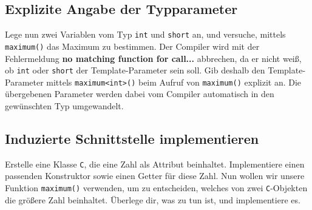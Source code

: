 \subsection{Explizite Angabe der Typparameter}
Lege nun zwei Variablen vom Typ \lstinline{int} und \lstinline{short} an, und versuche, mittels \lstinline{maximum()} das Maximum zu bestimmen.
Der Compiler wird mit der Fehlermeldung \textbf{no matching function for call...} abbrechen, da er nicht weiß, ob \lstinline{int} oder \lstinline{short} der Template-Parameter sein soll.
Gib deshalb den Template-Parameter mittels \lstinline{maximum<int>()} beim Aufruf von \lstinline{maximum()} explizit an.
Die übergebenen Parameter werden dabei vom Compiler automatisch in den gewünschten Typ umgewandelt.

\subsection{Induzierte Schnittstelle implementieren}
Erstelle eine Klasse \lstinline{C}, die eine Zahl als Attribut beinhaltet. Implementiere einen passenden Konstruktor sowie einen Getter für diese Zahl. Nun wollen wir unsere Funktion  \lstinline{maximum()} verwenden, um zu entscheiden, welches von zwei \lstinline{C}-Objekten die größere Zahl beinhaltet.
Überlege dir, was zu tun ist, und implementiere es.

